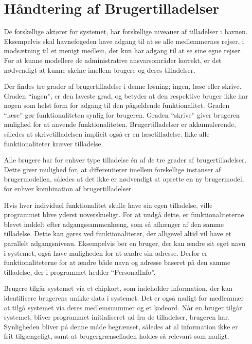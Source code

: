 \section{Håndtering af Brugertilladelser} %
\label{tilladelser}

De forskellige aktører for systemet, har forskellige niveauer af tilladelser i havnen. Eksempelvis skal havnefogeden have adgang til at se alle medlemmernes rejser, i modsætning til et menigt medlem, der kun har adgang til at se sine egne rejser. For at kunne modellere de administrative ansvarsområder korrekt, er det nødvendigt at kunne skelne imellem brugere og deres tilladelser.

Der findes tre grader af brugertilladelse i denne løsning; ingen, læse eller skrive. Graden \enquote{ingen}, er den laveste grad, og betyder at den respektive bruger ikke har nogen som helst form for adgang til den pågældende funktionalitet. Graden \enquote{læse} gør funktionaliteten synlig for brugeren. Graden \enquote{skrive} giver brugeren mulighed for at anvende funktionaliteten. Brugertilladelser er akkumulerende, således at skrivetilladelsen implicit også er en læsetilladelse. Ikke alle funktionaliteter kræver tilladelse.

Alle brugere har for enhver type tilladelse én af de tre grader af brugertilladelser. Dette giver mulighed for, at differentierer imellem forskellige instanser af brugermodellen, således at det ikke er nødvendigt at oprette en ny brugermodel, for enhver kombination af brugertilladelser.

Hvis hver individuel funktionalitet skulle have sin egen tilladelse, ville programmet blive yderst uoverskueligt. For at undgå dette, er funktionaliteterne blevet inddelt efter adgangssammenhæng, som så afhænger af den samme tilladelse. Dette kan gøres ved funktionaliteter, der alligevel altid vil have et parallelt adgangsniveau. Eksempelvis bør en bruger, der kan ændre sit eget navn i systemet, også have muligheden for at ændre sin adresse. Derfor er funktionaliteterne for at ændre både navn og adresse baseret på den samme tilladelse, der i programmet hedder \enquote{PersonalInfo}.

Brugere tilgår systemet via et chipkort, som indeholder information, der kan identificere brugerens unikke data i systemet. Det er også muligt for medlemmer at tilgå systemet via deres medlemsnummer og et kodeord. Når en bruger tilgår systemet, bliver programmet initialiseret ud fra de tilladelser, brugeren har. Synligheden bliver på denne måde begrænset, således at al information ikke er frit tilgængeligt, samt at brugergrænsefladen holdes så relevant som muligt.


